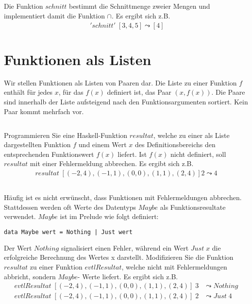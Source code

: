 \documentclass{article}
\begin{document}
\subsection{}
Die Funktion $schnitt$ bestimmt die Schnittmenge zweier Mengen und implementiert
damit die Funktion $\cap$. Es ergibt sich z.B.
\begin{align*}
[1, 2, 4] \;'schnitt'\; [3, 4, 5] \leadsto [4]
\end{align*}
\section{Funktionen als Listen}
Wir stellen Funktionen als Listen von Paaren dar. Die Liste zu einer Funktion $f$ enthält
für jedes $x$, für das $f (x)$ definiert ist, das Paar $(x, f(x))$. Die Paare sind innerhalb der Liste
aufsteigend nach den Funktionsargumenten sortiert. Kein Paar kommt mehrfach vor.
\subsection{}
Programmieren Sie eine Haskell-Funktion $resultat$, welche zu
einer als Liste dargestellten Funktion $f$ und einem Wert $x$ des Definitionsbereichs
den entsprechenden Funktionswert $f(x)$ liefert. Ist $f(x)$ nicht definiert, soll $resultat$
mit einer Fehlermeldung abbrechen. Es ergibt sich z.B.
\begin{align*}
resultat\; [(-2, 4), (-1, 1), (0, 0), (1, 1), (2, 4)] 2 \leadsto 4
\end{align*}
\subsection{}
Häufig ist es nicht erwünscht, dass Funktionen mit Fehlermeldungen abbrechen.
Stattdessen werden oft Werte des Datentyps $Maybe$ als Funktionsresultate verwendet.
$Maybe$ ist im Prelude wie folgt definiert:
\begin{lstlisting}
data Maybe wert = Nothing | Just wert
\end{lstlisting}
Der Wert $Nothing$ signalisiert einen Fehler, während ein Wert $Just\;x$ die erfolgreiche
Berechnung des Wertes x darstellt. Modifizieren Sie die Funktion $resultat$ zu einer
Funktion $evtlResultat$, welche nicht mit Fehlermeldungen abbricht, sondern $Maybe$-
Werte liefert. Es ergibt sich z.B.
\begin{align*}
evtlResultat\; [(-2, 4), (-1, 1), (0, 0), (1, 1), (2, 4)]\; 3 & \leadsto Nothing\\
evtlResultat\; [(-2, 4), (-1, 1), (0, 0), (1, 1), (2, 4)]\; 2 & \leadsto Just\;4
\end{align*}
\end{document}

